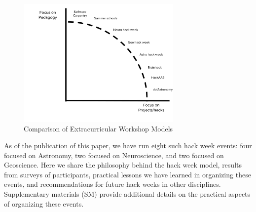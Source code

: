 \begin{figure}
\begin{center}
\includegraphics[width=8cm]{NewHackSpectrum.pdf}
\caption{Comparison of Extracurricular Workshop Models}
\label{fig:hackspectrum}
\end{center}
\end{figure}

As of the publication of this paper, we have run eight such hack week events: four focused on Astronomy, two focused on Neuroscience, and two focused on Geoscience.
Here we share the philosophy behind the hack week model, results from surveys of participants, practical lessons we have learned in organizing these events, and recommendations for future hack weeks in other disciplines. Supplementary materials (SM) provide additional details on the practical aspects of organizing these events.
